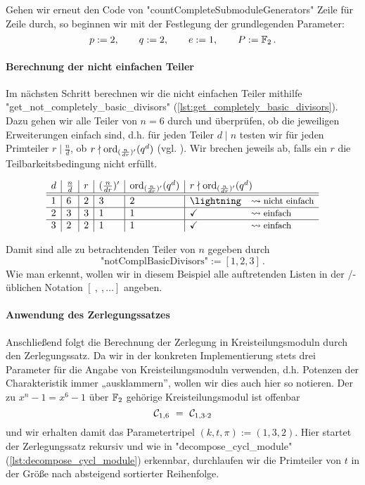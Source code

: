 Gehen wir erneut den Code von "countCompleteSubmoduleGenerators"
Zeile für Zeile durch, so beginnen wir mit der Festlegung der grundlegenden
Parameter:
\[ p := 2,\qquad q := 2,\qquad e := 1,\qquad P := \mathbb{F}_2\,.\]


\paragraph{Berechnung der nicht einfachen Teiler} Im nächsten Schritt berechnen
wir die nicht einfachen Teiler mithilfe "get_not_completely_basic_divisors" 
(\autoref{lst:get_completely_basic_divisors}).
Dazu gehen wir alle Teiler von $n=6$ durch und überprüfen, ob die jeweiligen
Erweiterungen einfach sind, d.h. für jeden Teiler $d \mid n$ testen wir für
jeden Primteiler $r \mid \tfrac{n}{d}$, ob $r \nmid \operatorname{ord}_{(\frac{n}{dr})'}(q^d)$
(vgl. ). Wir brechen jeweils ab, falls ein
$r$ die Teilbarkeitsbedingung nicht erfüllt.

\[ \begin{array}{l|l|l|l|l|ll} 
  d & \frac{n}{d} & r & (\frac{n}{dr})' & \ord_{(\frac{n}{dr})'}(q^d) & 
    \multicolumn{2}{l}{r \nmid \ord_{(\frac{n}{dr})'}(q^d)}\\\hline\hline
  1 & 6 & 2 & 3 & 2 & \lightning &\leadsto\text{\small nicht einfach}\\\hline
  2 & 3 & 3 & 1 & 1 & \checkmark & \leadsto\text{\small einfach}\\\hline
  3 & 2 & 2 & 1 & 1 & \checkmark & \leadsto\text{\small einfach}
  \end{array}\]

Damit sind alle zu betrachtenden Teiler von $n$ gegeben durch
\[ \text{"notComplBasicDivisors"} := [1,2,3]\,. \]
Wie man erkennt, wollen wir in diesem Beispiel alle auftretenden Listen in der
\python/\sage-üblichen Notation $[\ ,\ ,\ldots]$ angeben.


\paragraph{Anwendung des Zerlegungssatzes} Anschließend folgt die Berechnung
der Zerlegung in Kreisteilungsmoduln durch den Zerlegungssatz. Da wir in der
konkreten Implementierung stets drei Parameter für die Angabe von
Kreisteilungsmoduln verwenden, d.h. Potenzen der Charakteristik immer
„ausklammern”, wollen wir dies auch hier so notieren. Der zu
$x^n-1 = x^6-1$ über $\mathbb{F}_2$ gehörige Kreisteilungsmodul ist offenbar
\[ \mathcal{C}_{1,6} \ =\  \mathcal{C}_{1,3\cdot 2}\]
und wir erhalten damit das Parametertripel $(k,t,\pi) := (1,3,2)$.
Hier startet der Zerlegungssatz rekursiv und wie in "decompose_cycl_module" 
(\autoref{lst:decompose_cycl_module}) erkennbar, durchlaufen wir die Primteiler
von $t$ in der Größe nach absteigend sortierter Reihenfolge.

